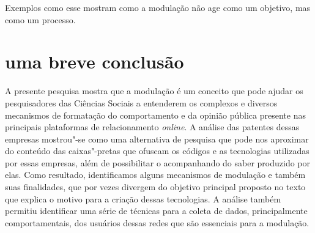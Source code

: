 Exemplos como esse mostram como a modulação não age como um objetivo,
mas como um processo.

\section{uma breve conclusão}

\noindent{}A presente pesquisa mostra que a modulação é um conceito que pode ajudar
os pesquisadores das Ciências Sociais a entenderem os complexos e
diversos mecanismos de formatação do comportamento e da opinião pública
presente nas principais plataformas de relacionamento \textit{online}. A análise
das patentes dessas empresas mostrou"-se como uma alternativa de pesquisa
que pode nos aproximar do conteúdo das caixas"-pretas que ofuscam os
códigos e as tecnologias utilizadas por essas empresas, além de
possibilitar o acompanhando do saber produzido por elas. Como resultado,
identificamos alguns mecanismos de modulação e também suas finalidades,
que por vezes divergem do objetivo principal proposto no texto que
explica o motivo para a criação dessas tecnologias. A análise também
permitiu identificar uma série de técnicas para a coleta de dados,
principalmente comportamentais, dos usuários dessas redes que são
essenciais para a modulação.


